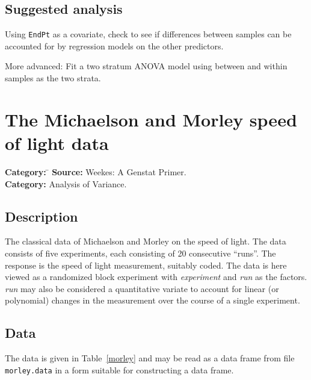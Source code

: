 \documentclass{article}
\newcommand{\code}[1]{\texttt{#1}}
\begin{document}
\subsection*{Suggested analysis}
Using \code{EndPt} as a covariate, check to see if differences between
samples can be accounted for by regression models on the other predictors.


More advanced:  Fit a two stratum ANOVA model using between and within
samples as the two strata.


\clearpage\section{The Michaelson and Morley speed of light data}
\begin{tabbing}
\textbf{Category:} \= \kill
\textbf{Source:} \> Weekes: A Genstat Primer.\\
\textbf{Category:} \> Analysis of Variance.
\end{tabbing}

\subsection*{Description}
The classical data of Michaelson and Morley on the speed of light.  The
data consists of five experiments, each consisting of 20 consecutive
``runs''.  The response is the speed of light measurement, suitably coded.
The data is here viewed as a randomized block experiment with
\textit{experiment} and \textit{run} as the factors.  \textit{run} may also be
considered a quantitative variate to account for linear (or polynomial)
changes in the measurement over the course of a single experiment.

\subsection*{Data}
The data is given in Table~\ref{morley} and may be read as a data frame
from file \code{morley.data} in a form suitable for constructing a data frame.
\end{document}
